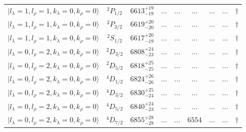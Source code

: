 \begin{tabular}{c c| c c c c c c c}
$\vert l_{\lambda}\!\!=\!1, l_{\rho}\!\!=\!1, k_{\lambda}\!\!=\!0, k_{\rho}\!\!=\!0 \rangle$ & $^{2}P_{1/2}$ & $6613^{+19}_{-19}$ & ... & ... & ... & ... & ... & $\dagger$ \\ 
$\vert l_{\lambda}\!\!=\!1, l_{\rho}\!\!=\!1, k_{\lambda}\!\!=\!0, k_{\rho}\!\!=\!0 \rangle$ & $^{2}P_{3/2}$ & $6619^{+20}_{-20}$ & ... & ... & ... & ... & ... & $\dagger$ \\ 
$\vert l_{\lambda}\!\!=\!1, l_{\rho}\!\!=\!1, k_{\lambda}\!\!=\!0, k_{\rho}\!\!=\!0 \rangle$ & $^{2}S_{1/2}$ & $6617^{+20}_{-19}$ & ... & ... & ... & ... & ... & $\dagger$ \\ 
$\vert l_{\lambda}\!\!=\!0, l_{\rho}\!\!=\!2, k_{\lambda}\!\!=\!0, k_{\rho}\!\!=\!0 \rangle$ & $^{2}D_{3/2}$ & $6808^{+24}_{-23}$ & ... & ... & ... & ... & ... & $\dagger$ \\ 
$\vert l_{\lambda}\!\!=\!0, l_{\rho}\!\!=\!2, k_{\lambda}\!\!=\!0, k_{\rho}\!\!=\!0 \rangle$ & $^{2}D_{5/2}$ & $6818^{+25}_{-25}$ & ... & ... & ... & ... & ... & $\dagger$ \\ 
$\vert l_{\lambda}\!\!=\!0, l_{\rho}\!\!=\!2, k_{\lambda}\!\!=\!0, k_{\rho}\!\!=\!0 \rangle$ & $^{4}D_{1/2}$ & $6824^{+26}_{-26}$ & ... & ... & ... & ... & ... & $\dagger$ \\ 
$\vert l_{\lambda}\!\!=\!0, l_{\rho}\!\!=\!2, k_{\lambda}\!\!=\!0, k_{\rho}\!\!=\!0 \rangle$ & $^{4}D_{3/2}$ & $6830^{+25}_{-24}$ & ... & ... & ... & ... & ... & $\dagger$ \\ 
$\vert l_{\lambda}\!\!=\!0, l_{\rho}\!\!=\!2, k_{\lambda}\!\!=\!0, k_{\rho}\!\!=\!0 \rangle$ & $^{4}D_{5/2}$ & $6840^{+24}_{-23}$ & ... & ... & ... & ... & ... & $\dagger$ \\ 
$\vert l_{\lambda}\!\!=\!0, l_{\rho}\!\!=\!2, k_{\lambda}\!\!=\!0, k_{\rho}\!\!=\!0 \rangle$ & $^{4}D_{7/2}$ & $6855^{+28}_{-28}$ & ... & ... & $6554$ & ... & ... & $\dagger$ \\ 
\hline \hline
\end{tabular}
